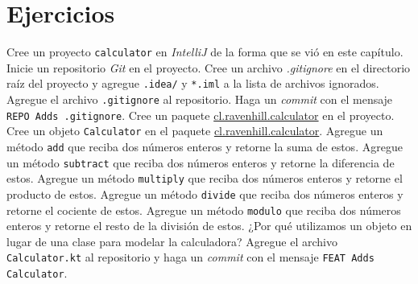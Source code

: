 \section{Ejercicios}
  \begin{Exercise}[title={Calculadora}]
    \Question Cree un proyecto \texttt{calculator} en \textit{IntelliJ} de la forma que se vió en 
      este capítulo.
    \Question Inicie un repositorio \textit{Git} en el proyecto.
    \Question Cree un archivo \textit{.gitignore} en el directorio raíz del proyecto y agregue
      \texttt{.idea/} y \texttt{*.iml} a la lista de archivos ignorados.
    \Question Agregue el archivo \texttt{.gitignore} al repositorio.
    \Question Haga un \textit{commit} con el mensaje \texttt{REPO Adds .gitignore}.
    \Question Cree un paquete \url{cl.ravenhill.calculator} en el proyecto.
    \Question Cree un objeto \texttt{Calculator} en el paquete \url{cl.ravenhill.calculator}.
    \Question Agregue un método \texttt{add} que reciba dos números enteros y retorne la suma de 
      estos.
    \Question Agregue un método \texttt{subtract} que reciba dos números enteros y retorne la
      diferencia de estos.
    \Question Agregue un método \texttt{multiply} que reciba dos números enteros y retorne el
      producto de estos.
    \Question Agregue un método \texttt{divide} que reciba dos números enteros y retorne el
      cociente de estos.
    \Question Agregue un método \texttt{modulo} que reciba dos números enteros y retorne el
      resto de la división de estos.
    \Question ¿Por qué utilizamos un objeto en lugar de una clase para modelar la calculadora?
    \Question Agregue el archivo \texttt{Calculator.kt} al repositorio y haga un \textit{commit}
      con el mensaje \texttt{FEAT Adds Calculator}.
  \end{Exercise}

